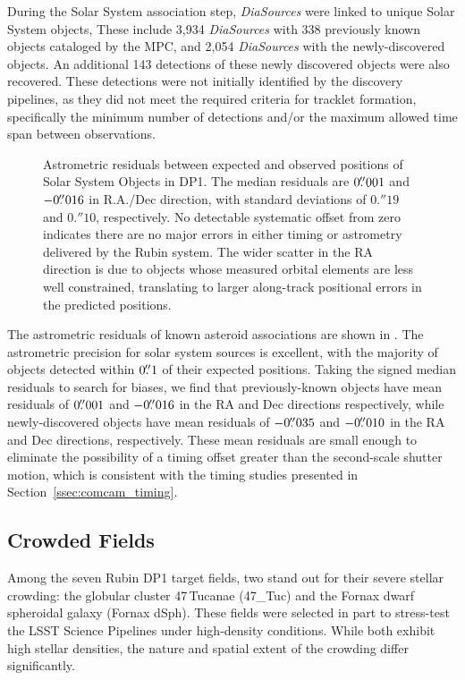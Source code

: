 During the Solar System association step,  \nsolarsystemsources \textit{DiaSources} were linked to \nsolarsystemobjects  unique Solar System objects, 
These include 3,934 \textit{DiaSources} with 338 previously known objects cataloged by the \gls{MPC}, and 2,054 \textit{DiaSources} with the \nnewasteroiddiscoveries  newly-discovered objects. 
An additional 143 detections of these newly discovered objects were also recovered. 
These detections were not initially identified by the discovery pipelines, as they did not meet the required criteria for tracklet formation, specifically the minimum number of detections and/or the maximum allowed time span between observations.

\begin{figure}[htb!]
\caption{Astrometric residuals between expected and observed positions of Solar System Objects in \gls{DP1}. 
The median residuals are $0\mbox{$.\!\!^{\prime\prime}$}001$ and $-0\mbox{$.\!\!^{\prime\prime}$}016$ in R.A./Dec direction, with  standard deviations of $0.''19$ and $0.''10$, respectively. 
No detectable systematic offset from zero indicates there are no major errors in either timing or astrometry delivered by the Rubin system. 
The wider scatter in the RA direction is due to objects whose measured orbital elements are less well constrained, translating to larger along-track positional errors in the predicted positions.}
\label{fig:sso_residuals}
\end{figure}

The astrometric residuals of known asteroid associations are shown in .
The astrometric precision for solar system sources is excellent, with the majority of objects detected within $0\mbox{$.\!\!^{\prime\prime}$}1$ of their expected positions.
Taking the signed median residuals to search for biases, we find that previously-known objects have mean residuals of $0\mbox{$.\!\!^{\prime\prime}$}001$ and $-0\mbox{$.\!\!^{\prime\prime}$}016$ in the RA and Dec directions respectively, while newly-discovered objects have mean residuals of $-0\mbox{$.\!\!^{\prime\prime}$}035$ and $-0\mbox{$.\!\!^{\prime\prime}$}010$ in the RA and Dec directions, respectively.
These mean residuals are small enough to eliminate the possibility of a timing offset greater than the second-scale shutter motion, which is consistent with the timing studies presented in Section~\ref{ssec:comcam_timing}.

\subsection{Crowded Fields}
Among the seven Rubin DP1 target fields, two stand out for their severe stellar crowding: the globular cluster 47\,Tucanae (47\_Tuc) and the Fornax dwarf spheroidal galaxy (Fornax dSph).
These fields were selected in part to stress-test the LSST Science Pipelines under high-density conditions. 
While both exhibit high stellar densities, the nature and spatial extent of the crowding differ significantly.

